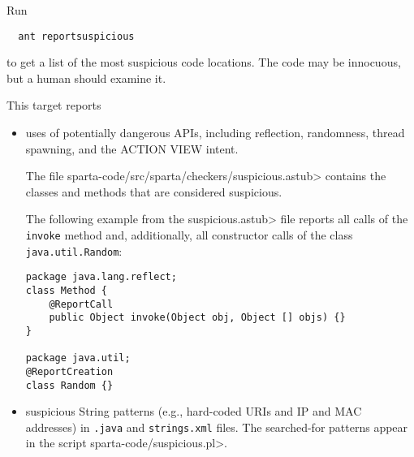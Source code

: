 Run

\begin{Verbatim}
  ant reportsuspicious
\end{Verbatim}

\noindent
to get a list of the most suspicious code
locations. 
The code may be innocuous, but a human should examine it.

This target reports
\begin{itemize}
\item
  uses of potentially dangerous APIs, including reflection, randomness,
  thread spawning, and the ACTION VIEW intent.

  The file \<sparta-code/src/sparta/checkers/suspicious.astub> contains the classes and methods that are considered suspicious.

The following example from the \<suspicious.astub> file reports all calls
of the \verb|invoke| method and, additionally, all constructor calls 
of the class \verb|java.util.Random|:

\begin{Verbatim}
package java.lang.reflect;                                             
class Method {                                                         
    @ReportCall                                                        
    public Object invoke(Object obj, Object [] objs) {}                
}                                                                      
                                                                       
package java.util;                                                     
@ReportCreation                                                        
class Random {}
\end{Verbatim}

\item
  suspicious String patterns (e.g., hard-coded URIs and IP and MAC addresses) 
  in \verb|.java| and \verb|strings.xml| files.  The searched-for patterns
  appear in the script \<sparta-code/suspicious.pl>.


\end{itemize}

